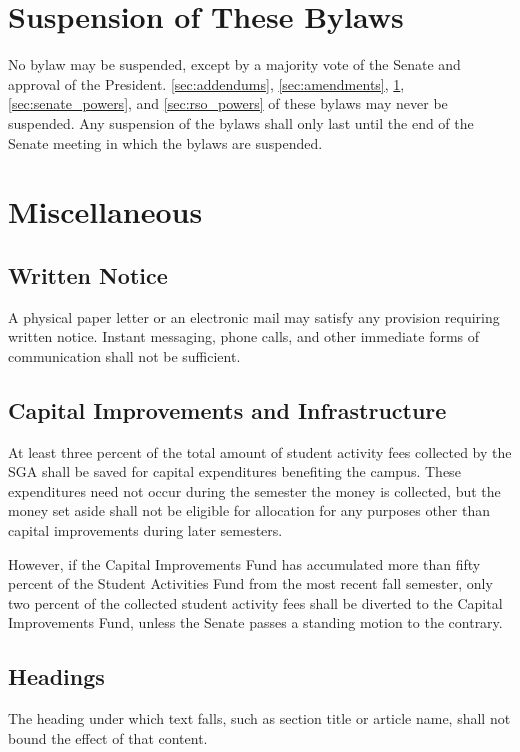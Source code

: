 \documentclass[12pt]{scrreprt}
\begin{document}
\chapter{Suspension of These Bylaws} \label{sec:suspension}
No bylaw may be suspended, except by a majority vote of the Senate and 
approval of the President. \ref{sec:addendums}, \ref{sec:amendments}, \ref{sec:suspension}, 
\ref{sec:senate_powers}, and \ref{sec:rso_powers} of these bylaws may never be 
suspended. Any suspension of the bylaws shall only last until the end of the 
Senate meeting in which the bylaws are suspended. 

\chapter{Miscellaneous}

\section{Written Notice}
A physical paper letter or an electronic mail may satisfy any provision 
requiring written notice. Instant messaging, phone calls, and other immediate 
forms of communication shall not be sufficient. 

\section{Capital Improvements and Infrastructure}
At least three percent of the total amount of student activity fees collected 
by the SGA shall be saved for capital expenditures benefiting the campus. 
These expenditures need not occur during the semester the money is collected, 
but the money set aside shall not be eligible for allocation for any purposes 
other than capital improvements during later semesters. 

However, if the Capital Improvements Fund has accumulated more than fifty 
percent of the Student Activities Fund from the most recent fall semester, 
only two percent of the collected student activity fees shall be diverted to 
the Capital Improvements Fund, unless the Senate passes a standing motion to 
the contrary. 

\section{Headings}
The heading under which text falls, such as section title or article name, 
shall not bound the effect of that content. 
\end{document}
